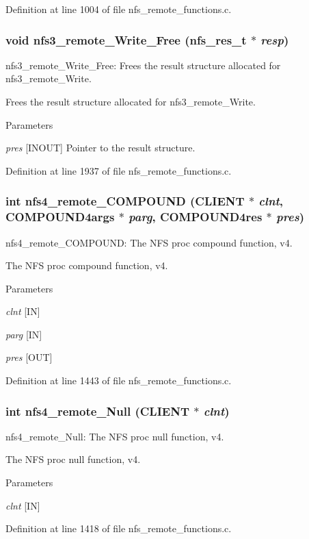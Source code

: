 Definition at line 1004 of file nfs\_\-remote\_\-functions.c.
\subsubsection[{nfs3\_\-remote\_\-Write\_\-Free}]{\setlength{\rightskip}{0pt plus 5cm}void nfs3\_\-remote\_\-Write\_\-Free (nfs\_\-res\_\-t $\ast$ {\em resp})}\label{group__NFSprocs_gafea098a72d21596dae1cf828fae1962f}
nfs3\_\-remote\_\-Write\_\-Free: Frees the result structure allocated for nfs3\_\-remote\_\-Write.

Frees the result structure allocated for nfs3\_\-remote\_\-Write.


\begin{DoxyParams}{Parameters}
\item[{\em pres}][INOUT] Pointer to the result structure. \end{DoxyParams}


Definition at line 1937 of file nfs\_\-remote\_\-functions.c.
\subsubsection[{nfs4\_\-remote\_\-COMPOUND}]{\setlength{\rightskip}{0pt plus 5cm}int nfs4\_\-remote\_\-COMPOUND (CLIENT $\ast$ {\em clnt}, \/  COMPOUND4args $\ast$ {\em parg}, \/  COMPOUND4res $\ast$ {\em pres})}\label{group__NFSprocs_ga48b01a768677c14f9e3ba0899b420973}
nfs4\_\-remote\_\-COMPOUND: The NFS proc compound function, v4.

The NFS proc compound function, v4.


\begin{DoxyParams}{Parameters}
\item[{\em clnt}][IN] \item[{\em parg}][IN] \item[{\em pres}][OUT] \end{DoxyParams}


Definition at line 1443 of file nfs\_\-remote\_\-functions.c.
\subsubsection[{nfs4\_\-remote\_\-Null}]{\setlength{\rightskip}{0pt plus 5cm}int nfs4\_\-remote\_\-Null (CLIENT $\ast$ {\em clnt})}\label{group__NFSprocs_gaafde9fd4cee9adced32a2c72237fbf1b}
nfs4\_\-remote\_\-Null: The NFS proc null function, v4.

The NFS proc null function, v4.


\begin{DoxyParams}{Parameters}
\item[{\em clnt}][IN] \end{DoxyParams}


Definition at line 1418 of file nfs\_\-remote\_\-functions.c.